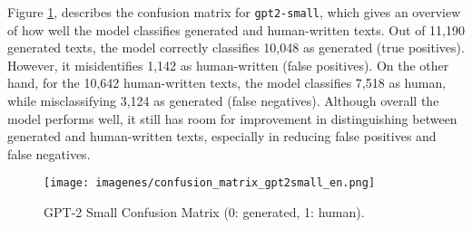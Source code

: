 \documentclass[a4paper,11pt,twocolumn,twoside]{article}
\begin{document}
\begin{table}[!h]
    \centering
    \caption{GPT-2 models with threshold 2/3 F1-scores (subtask 1 for English).}
    \label{tab:gpt2-models-eval}
\end{table}

Figure \ref{fig:confusion_matrix_gpt2small_en}, describes the confusion matrix for \texttt{gpt2-small}, which gives an overview of how well the model classifies generated and human-written texts. Out of 11,190 generated texts, the model correctly classifies 10,048 as generated (true positives). However, it misidentifies 1,142 as human-written (false positives). On the other hand, for the 10,642 human-written texts, the model classifies 7,518 as human, while misclassifying 3,124 as generated (false negatives). Although overall the model performs well, it still has room for improvement in distinguishing between generated and human-written texts, especially in reducing false positives and false negatives.
\begin{figure}
    \centering
    \texttt{[image: imagenes/confusion\_matrix\_gpt2small\_en.png]}
    \caption{GPT-2 Small Confusion Matrix (0:
generated, 1: human).}
    \label{fig:confusion_matrix_gpt2small_en}
\end{figure}
\end{document}
